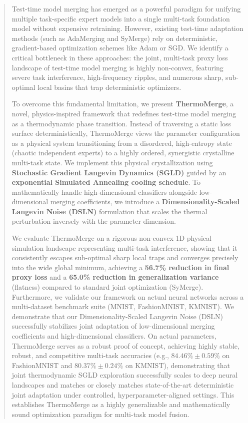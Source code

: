 \begin{abstract}
Test-time model merging has emerged as a powerful paradigm for unifying multiple task-specific expert models into a single multi-task foundation model without expensive retraining.
However, existing test-time adaptation methods (such as AdaMerging and SyMerge) rely on deterministic, gradient-based optimization schemes like Adam or SGD.
We identify a critical bottleneck in these approaches: the joint, multi-task proxy loss landscape of test-time model merging is highly non-convex, featuring severe task interference, high-frequency ripples, and numerous sharp, sub-optimal local basins that trap deterministic optimizers.

To overcome this fundamental limitation, we present \textbf{ThermoMerge}, a novel, physics-inspired framework that redefines test-time model merging as a thermodynamic phase transition.
Instead of traversing a static loss surface deterministically, ThermoMerge views the parameter configuration as a physical system transitioning from a disordered, high-entropy state (chaotic independent experts) to a highly ordered, synergistic crystalline multi-task state.
We implement this physical crystallization using \textbf{Stochastic Gradient Langevin Dynamics (SGLD)} guided by an \textbf{exponential Simulated Annealing cooling schedule}.
To mathematically handle high-dimensional classifiers alongside low-dimensional merging coefficients, we introduce a \textbf{Dimensionality-Scaled Langevin Noise (DSLN)} formulation that scales the thermal perturbation inversely with the parameter dimension.

We evaluate ThermoMerge on a rigorous non-convex 1D physical simulation landscape representing multi-task interference, showing that it consistently escapes sub-optimal sharp local traps and converges precisely into the wide global minimum, achieving a \textbf{56.7\% reduction in final proxy loss} and a \textbf{65.0\% reduction in generalization variance} (flatness) compared to standard joint optimization (SyMerge).
Furthermore, we validate our framework on actual neural networks across a multi-dataset benchmark suite (MNIST, FashionMNIST, KMNIST).
We demonstrate that our Dimensionality-Scaled Langevin Noise (DSLN) successfully stabilizes joint adaptation of low-dimensional merging coefficients and high-dimensional classifiers.
On actual parameters, ThermoMerge serves as a robust proof of concept, achieving highly stable, robust, and competitive multi-task accuracies (e.g., $84.46\% \pm 0.59\%$ on FashionMNIST and $80.37\% \pm 0.24\%$ on KMNIST), demonstrating that joint thermodynamic SGLD exploration successfully scales to deep neural landscapes and matches or closely matches state-of-the-art deterministic joint adaptation under controlled, hyperparameter-aligned settings.
This establishes ThermoMerge as a highly generalizable and mathematically sound optimization paradigm for multi-task model fusion.
\end{abstract}